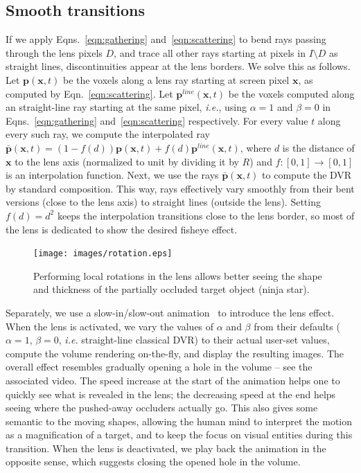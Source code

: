 \subsection{Smooth transitions}
\label{continuity}
%
If we apply Eqns.~\ref{eqn:gathering} and~\ref{eqn:scattering} to bend rays passing through the lens pixels $D$, and trace all other rays starting at pixels in $I \setminus D$ as straight lines, discontinuities appear at the lens borders. We solve this as follows. Let $\mathbf{p}(\mathbf{x},t)$ be the voxels along a lens ray starting at screen pixel $\mathbf{x}$, as computed by Eqn.~\ref{eqn:scattering}. Let $\mathbf{p}^{line}(\mathbf{x},t)$ be the voxels computed along an straight-line ray starting at the same pixel, \emph{i.e.}, using $\alpha=1$ and $\beta=0$ in Eqns.~\ref{eqn:gathering} and~\ref{eqn:scattering} respectively. For every value $t$ along every such ray, we compute the interpolated ray
$\bar{\mathbf{p}}(\mathbf{x},t) = (1-f(d))\mathbf{p}(\mathbf{x},t) + f(d)\mathbf{p}^{line}(\mathbf{x},t)$, where $d$ is the distance of $\mathbf{x}$ to the lens axis (normalized to unit by dividing it by $R$) and $f : [0,1] \rightarrow [0,1]$ is an interpolation function. Next, we use the rays $\bar{\mathbf{p}}(\mathbf{x},t)$ to compute the DVR by standard composition. This way, rays effectively vary smoothly from their bent versions (close to the lens axis) to straight lines (outside the lens). Setting $f(d) = d^2$ keeps the interpolation transitions close to the lens border, so most of the lens is dedicated to show the desired fisheye effect.


\begin{figure}[htbp!]
\centering
\texttt{[image: images/rotation.eps]}
\vspace{-0.15cm}
\caption{Performing local rotations in the lens allows better seeing the shape and thickness of the partially occluded target object (ninja star).}
\label{f:rotation}
\vspace{-0.15cm}
\end{figure}



Separately, we use a slow-in/slow-out animation~\cite{Dragicevic:2011:TDA:1978942.1979233} to introduce the lens effect. When the lens is activated, we vary the values of $\alpha$ and $\beta$ from their defaults ($\alpha=1$, $\beta=0$, \emph{i.e.} straight-line classical DVR) to their actual user-set values, compute the volume rendering on-the-fly, and display the resulting images. The overall effect resembles gradually opening a hole in the volume -- see the associated video. The speed increase at the start of the animation helps one to quickly see what is revealed in the lens; the decreasing speed at the end helps seeing where the pushed-away occluders actually go. This also gives some semantic to the moving shapes, allowing the human mind to interpret the motion as a magnification of a target, and to keep the focus on visual entities during this transition. When the lens is deactivated, we play back the animation in the opposite sense, which suggests closing the opened hole in the volume.

